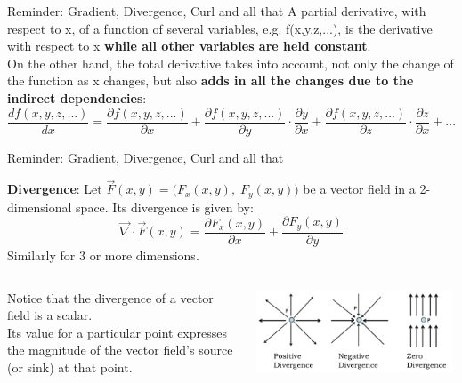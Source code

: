 {\begin{frame}{Reminder: Gradient, Divergence, Curl and all that}
\vspace{0.2cm}
A partial derivative, with respect to x, of a function of several variables, e.g. f(x,y,z,...),
is the derivative with respect to x {\bf while all other variables are held constant}.\\

\vspace{0.2cm}
On the other hand, the total derivative takes into account, not only the change of the function as x changes,
but also {\bf adds in all the changes due to the indirect dependencies}:
\begin{equation*}
   \frac{df(x,y,z,...)}{dx} =
     \frac{\partial f(x,y,z,...)}{\partial x} +
     \frac{\partial f(x,y,z,...)}{\partial y} \cdot \frac{\partial y}{\partial x} +
     \frac{\partial f(x,y,z,...)}{\partial z} \cdot \frac{\partial z}{\partial x} + ...
\end{equation*}

\end{frame}


%
%
%

\begin{frame}{Reminder: Gradient, Divergence, Curl and all that}

\underline{\bf Divergence}:
Let $\vec{F}(x,y)=\Big(F_{x}(x,y), \; F_{y}(x,y) \Big)$
be a vector field in a 2-dimensional space. Its divergence is given by:
\begin{equation*}
   \vec\nabla \cdot \vec{F}(x,y) =
       \frac{\partial F_{x}(x,y)}{\partial x} +
       \frac{\partial F_{y}(x,y)}{\partial y}
\end{equation*}
Similarly for 3 or more dimensions.\\
\vspace{0.1cm}

\begin{columns}
  \begin{column}{0.40\textwidth}
    Notice that the divergence of a vector field is a scalar.\\
    Its value for a particular point expresses the magnitude of the vector field's source (or sink) at that point.
  \end{column}
  \begin{column}{0.60\textwidth}
   \begin{center}
     \includegraphics[width=0.98\textwidth]{./images/schematics/divergence_examples.png}\\
   \end{center}
  \end{column}
\end{columns}


\end{frame}}
